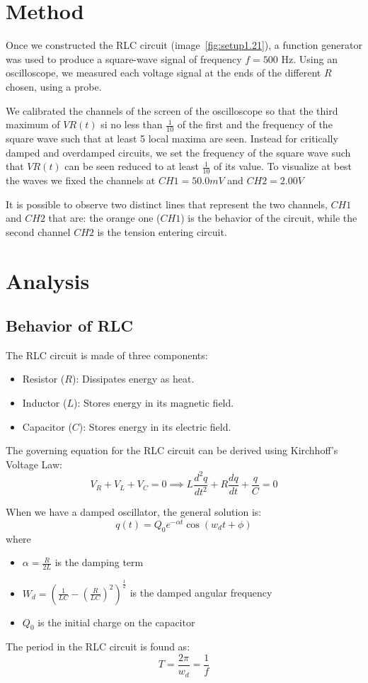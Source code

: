 \documentclass[notitlepage]{report}
\numberwithin{equation}{section}
\theoremstyle{plain}
\theoremstyle{definition}
\theoremstyle{remark}
\begin{document}
\section{Method}
Once we constructed the RLC circuit (image~\ref{fig:setup1.21}), a function
generator was used
to produce a square-wave signal of frequency $f = 500$ Hz. Using an
oscilloscope, we measured each voltage signal at the ends of the different $R$
chosen, using a probe.

We calibrated the channels of the screen of the oscilloscope so that the third
maximum of \(VR{(t)}\) si no less than $\frac{1}{10}$ of the first and the
frequency of the square wave such that at least 5 local maxima are seen. Instead
for critically damped and overdamped circuits, we set the frequency of the
square wave such that \(VR{(t)}\) can be seen reduced to at least $\frac{1}{10}$
of its value. To visualize at best the waves we fixed the channels at \(CH1 =
50.0 mV\) and \(CH2 = 2.00 V\) 

It is possible to observe two distinct lines that represent the two channels,
\(CH1\) and \(CH2\) that are: the orange one (\(CH1\)) is the behavior of the
circuit, while the second channel \(CH2\) is the tension entering circuit.

\section{Analysis}
\subsection{Behavior of RLC}
The RLC circuit is made of three components:
\begin{itemize}
    \item Resistor (\(R\)): Dissipates energy as heat.
    \item Inductor (\(L\)): Stores energy in its magnetic field.
    \item Capacitor (\(C\)): Stores energy in its electric field.
\end{itemize}

The governing equation for the RLC circuit can be derived using Kirchhoff's
Voltage Law:
\[ V_R + V_L + V_C = 0 \implies  L\frac{d^2q}{dt^2} + R\frac{dq}{dt} + \frac{q}{C} = 0 \]

When we have a damped oscillator, the general solution is:
\[
  q{(t)} = Q_{0} e^{-\alpha t} \cos{(w_d t + \phi)}
\]
where 
\begin{itemize}[label = --]
    \item \(\alpha = \frac{R}{2L}\) is the damping term
    \item \(W_d = {\left( \frac{1}{LC} - {\left( \frac{R}{LC} \right)} ^2
        \right)}^{\frac{1}{2}} \) is the damped angular frequency
    \item \(Q_{0}\) is the initial charge on the capacitor
\end{itemize}
The period in the RLC circuit is found as:
\[
    T = \frac{2\pi}{w_d} = \frac{1}{f}
\]
\end{document}
